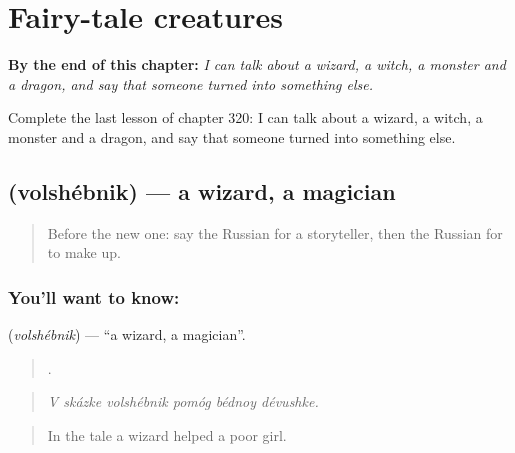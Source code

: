 
\chapter{Fairy-tale creatures}
\label{ch:ru-fairy-tale-creatures}

\begin{chapteropening}
\textbf{By the end of this chapter:} \emph{I can talk about a wizard, a witch, a monster and a dragon, and say that someone turned into something else.}

Complete the last lesson of chapter 320: I can talk about a wizard, a witch, a monster and a dragon, and say that someone turned into something else.
\end{chapteropening}

\section[\texorpdfstring{\ru{волшебник} (volshébnik)}{волшебник (volshébnik)}]{ (volshébnik) — a wizard, a magician}

\label{lesson:RU-C320-volshebnik}



\begin{quote}
Before the new one: say the Russian for a storyteller, then the Russian for to make up.
\end{quote}

\subsection*{You'll want to know: }
\textbf{} (\emph{volshébnik}) — \textquotedblleft{}a wizard, a magician\textquotedblright{}.

\begin{quote}
     .
\end{quote}

\begin{quote}
\emph{V skázke volshébnik pomóg bédnoy dévushke.}
\end{quote}

\begin{quote}
In the tale a wizard helped a poor girl.
\end{quote}

